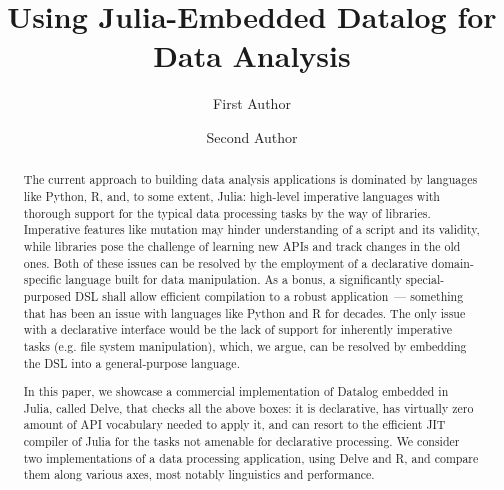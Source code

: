 \documentclass[runningheads]{llncs}
\begin{document}
%
\title{Using Julia-Embedded Datalog for Data Analysis}
%
%
\author{%
First Author%
\and
Second Author%
}
%
%
%
\maketitle              %
%
\begin{abstract}
The current approach to building data analysis applications is 
dominated by languages like Python, R, and, to some extent, Julia: 
high-level imperative languages with thorough support for the typical 
data processing tasks by the way of libraries. Imperative features like 
mutation may hinder understanding of a script and its validity, while
libraries pose the challenge of learning new APIs and track changes in
the old ones. Both of these issues can be resolved by the employment of 
a declarative domain-specific language built for data manipulation. 
As a bonus, a significantly special-purposed DSL shall
allow efficient compilation to a robust application~--- something that 
has been an issue with languages like Python and R for decades. The
only issue with a declarative interface would be the lack of support 
for inherently imperative tasks (e.g. file system manipulation), which, 
we argue, can be resolved by embedding the DSL into a general-purpose 
language.

In this paper, we showcase a commercial implementation of Datalog
embedded in Julia, called Delve, that checks all the above boxes: it is declarative,
has virtually zero amount of API vocabulary needed to apply it,
and can resort to the efficient JIT compiler of Julia for the tasks
not amenable for declarative processing. We consider two implementations
of a data processing application, using Delve and R, and compare them
along various axes, most notably linguistics and performance.



\end{abstract}
%
%
%



%
%
%


%
\end{document}
